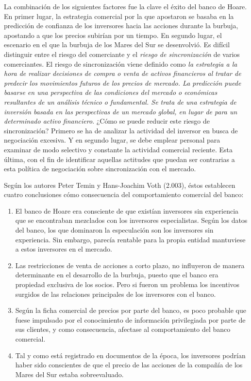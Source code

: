 La combinación de los siguientes factores fue la clave el éxito del banco de Hoare. En primer lugar, la estrategia comercial por la que apostaron se basaba en la predicción de confianza de los inversores hacia las acciones durante la burbuja, apostando a que los precios subirían por un tiempo. En segundo lugar, el escenario en el que la burbuja de los Mares del Sur se desenvolvió. Es difícil distinguir entre el riesgo del comerciante y el \emph{riesgo de sincronización} de varios comerciantes. El riesgo de sincronización viene definido como \emph{la estrategia a la hora de realizar decisiones de compra o venta de activos financieros al tratar de predecir los movimientos futuros de los precios de mercado. La predicción puede basarse en una perspectiva de las condiciones del mercado o económicas resultantes de un análisis técnico o fundamental. Se trata de una estrategia de inversión basada en las perspectivas de un mercado global, en lugar de para un determinado activo financiero}. ¿Cómo se puede reducir este riesgo de sincronización? Primero se ha de analizar la actividad del inversor en busca de negociación excesiva. Y en segundo lugar, se debe emplear personal para examinar de modo selectivo y constante la actividad comercial reciente. Esta última, con el fin de identificar aquellas actitudes que puedan ser contrarias a esta política de negociación sobre sincronización con el mercado.

Según los autores Peter Temin y Hans-Joachim Voth (2.003), éstos establecen cuatro conclusiones cómo consecuencia del comportamiento comercial del banco:

\begin{enumerate}
	\item El banco de Hoare era consciente de que existían inversores sin experiencia que se encontraban mezclados con los inversores especialistas. Según los datos del banco, los que dominaron la especulación son los inversores sin experiencia. Sin embargo, parecía rentable para la propia entidad mantuviese a estos inversores en el mercado.
	\item Las restricciones de venta de acciones a corto plazo, no influyeron de manera determinante en el desarrollo de la burbuja, puesto que el banco era propiedad exclusiva de los socios. Pero si fueron un problema los incentivos surgidos de las relaciones principales de los inversores con el banco. 
	\item Según la ficha comercial de precios por parte del banco, es poco probable que fuese impulsado por el conocimiento de información privilegiada por parte de sus clientes, y como consecuencia, afectase al comportamiento del banco comercial. 
	\item Tal y como está registrado en documentos de la época, los inversores podrían haber sido conscientes de que el precio de las acciones de la compañía de los Mares del Sur estaba sobreevaluado. 
\end{enumerate}

